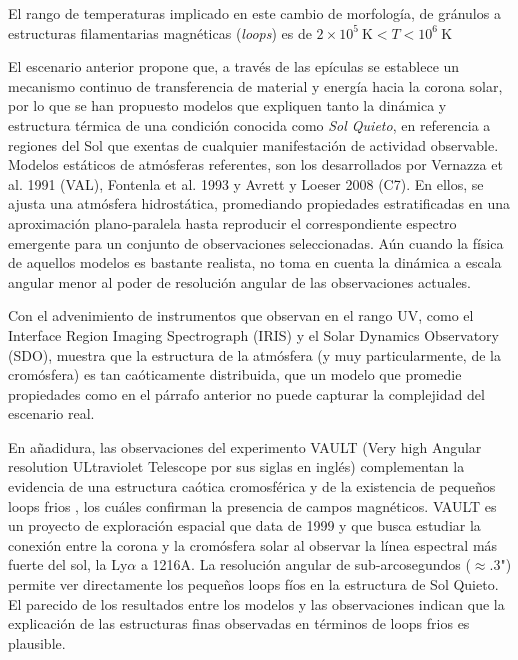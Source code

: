 
El rango de temperaturas implicado en este cambio de morfolog\'ia, de gr\'anulos a estructuras filamentarias magn\'eticas (\emph{loops}) es de $2\times 10^5~\mbox{K} < T < 10^6~\mbox{K}$

El escenario anterior propone que, a trav\'es de las ep\'iculas se establece un mecanismo continuo de transferencia de material y energ\'ia hacia la corona solar, por lo que se han propuesto modelos que expliquen tanto la din\'amica y estructura t\'ermica de una condici\'on conocida como \emph{Sol Quieto}, en referencia a regiones del Sol que exentas de cualquier manifestaci\'on de actividad observable. Modelos est\'aticos de atm\'osferas referentes, son los desarrollados por Vernazza et al. 1991 (VAL), Fontenla et al. 1993 y Avrett y Loeser 2008 (C7). En ellos, se ajusta una atm\'osfera hidrost\'atica, promediando propiedades estratificadas en una aproximaci\'on plano-paralela hasta reproducir el correspondiente espectro emergente para un conjunto de observaciones seleccionadas. A\'un cuando la f\'isica de aquellos modelos es bastante realista, no toma en cuenta la din\'amica a escala angular menor al poder de resoluci\'on angular de las observaciones actuales.

Con el advenimiento de instrumentos que observan en el rango UV, como el Interface Region Imaging Spectrograph (IRIS) y el Solar Dynamics Observatory (SDO), muestra que la estructura de la atm\'osfera (y muy particularmente, de la crom\'osfera) es tan ca\'oticamente distribuida, que un modelo que promedie propiedades como en el p\'arrafo anterior no puede capturar la complejidad del escenario real.

En a\~nadidura, las  observaciones del experimento VAULT (Very high Angular resolution ULtraviolet Telescope por sus siglas en ingl\'es) complementan la evidencia de una estructura ca\'otica cromosf\'erica y de la existencia de peque\~nos loops frios \citep{VAULT1}, los cu\'ales confirman la presencia de campos magn\'eticos.
VAULT es un proyecto de exploraci\'on espacial que data de 1999 y que busca estudiar la conexi\'on entre la corona y la crom\'osfera solar al observar la l\'inea espectral m\'as fuerte del sol, la Ly$\alpha$ a 1216A.
La resoluci\'on angular de sub-arcosegundos ($\approx$.3") permite ver directamente los peque\~nos loops f\'ios en la estructura de Sol Quieto. El parecido de los resultados entre los modelos y las observaciones indican que la explicaci\'on de las estructuras finas observadas en t\'erminos de loops frios es plausible.

